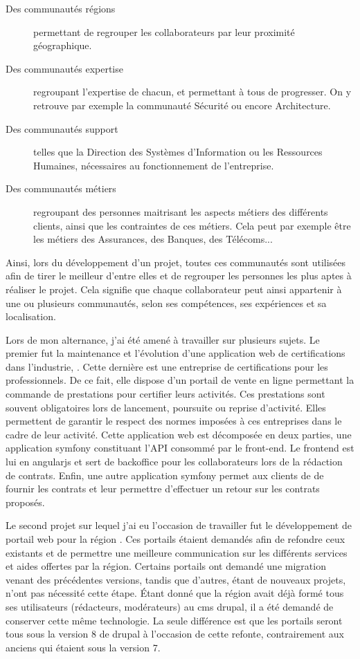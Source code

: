 \begin{description}
	\item [Des communautés régions] permettant de regrouper les collaborateurs par leur proximité géographique.
	\item [Des communautés expertise] regroupant l'expertise de chacun, et permettant à tous de progresser. On y retrouve par exemple la communauté Sécurité ou encore Architecture.
	\item [Des communautés support] telles que la Direction des Systèmes d'Information ou les Ressources Humaines, nécessaires au fonctionnement de l'entreprise.
	\item [Des communautés métiers] regroupant des personnes maitrisant les aspects métiers des différents clients, ainsi que les contraintes de ces métiers. Cela peut par exemple être les métiers des Assurances, des Banques, des Télécoms... 
\end{description}

Ainsi, lors du développement d'un projet, toutes ces communautés sont utilisées afin de tirer le meilleur d'entre elles et de regrouper les personnes les plus aptes à réaliser le projet. Cela signifie que chaque collaborateur peut ainsi appartenir à une ou plusieurs communautés, selon ses compétences, ses expériences et sa localisation. 

Lors de mon alternance, j'ai été amené à travailler sur plusieurs sujets. Le premier fut la maintenance et l'évolution d'une application web de certifications dans l'industrie, \bv. Cette dernière est une entreprise de certifications pour les professionnels. De ce fait, elle dispose d’un portail de vente en ligne permettant la commande de prestations pour certifier leurs activités. Ces prestations sont souvent obligatoires lors de lancement, poursuite ou reprise d'activité. Elles permettent de garantir le respect des normes imposées à ces entreprises dans le cadre de leur activité. Cette application web est décomposée en deux parties, une application \gls{symfony} constituant l'\gls{API} consommé par le front-end. Le \gls{frontend} est lui en \gls{angularjs} et sert de \gls{backoffice} pour les collaborateurs \bv{} lors de la rédaction de contrats. Enfin, une autre application \gls{symfony} permet aux clients de \bv{} de fournir les contrats et leur permettre d'effectuer un retour sur les contrats proposés.

Le second projet sur lequel j'ai eu l'occasion de travailler fut le développement de portail web pour la région \naq{}. Ces portails étaient demandés afin de refondre ceux existants et de permettre une meilleure communication sur les différents services et aides offertes par la région. Certains portails ont demandé une migration venant des précédentes versions, tandis que d'autres, étant de nouveaux projets, n'ont pas nécessité cette étape. Étant donné que la région avait déjà formé tous ses utilisateurs (rédacteurs, modérateurs) au \gls{cms} \gls{drupal}, il a été demandé de conserver cette même technologie. La seule différence est que les portails seront tous sous la version 8 de \gls{drupal} à l'occasion de cette refonte, contrairement aux anciens qui étaient sous la version 7. 

